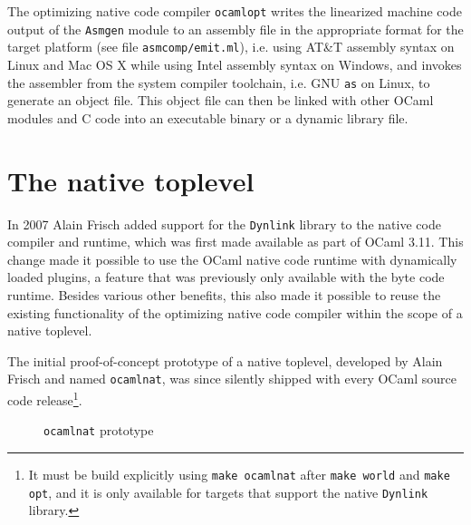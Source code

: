 \documentclass[10pt,a4paper,draft,twocolumn]{article}
\makeatletter
\newcommand{\ie}{i.e.\@\xspace}
\makeatother
\begin{document}
The optimizing native code compiler \texttt{ocamlopt} writes the linearized machine code output of the
\texttt{Asmgen} module to an assembly file in the appropriate format for the target platform (see file
\texttt{asmcomp/emit.ml}), \ie using AT\&T assembly syntax on Linux and Mac OS X while using Intel assembly
syntax on Windows, and invokes the assembler from the system compiler toolchain, \ie GNU \texttt{as} on Linux,
to generate an object file. This object file can then be linked with other OCaml modules and C code into
an executable binary or a dynamic library file.


\section{The native toplevel} \label{section:The_native_toplevel}

In 2007 Alain Frisch added support for the \texttt{Dynlink} library to the native code compiler and
runtime, which was first made available as part of OCaml 3.11. This change made it possible to use
the OCaml native code runtime with dynamically loaded plugins, a feature that was previously only
available with the byte code runtime. Besides various other benefits, this also made it possible
to reuse the existing functionality of the optimizing native code compiler within the scope of a
native toplevel.

The initial proof-of-concept prototype of a native toplevel, developed by Alain Frisch and named
\texttt{ocamlnat}, was since silently shipped with every OCaml source code release\footnote{It must
be build explicitly using \texttt{make ocamlnat} after \texttt{make world} and \texttt{make opt},
and it is only available for targets that support the native \texttt{Dynlink} library.}.

\begin{figure}[htb]
  \centering
  \caption{\texttt{ocamlnat} prototype}
  \label{fig:ocamlnat_prototype}
\end{figure}
\end{document}
